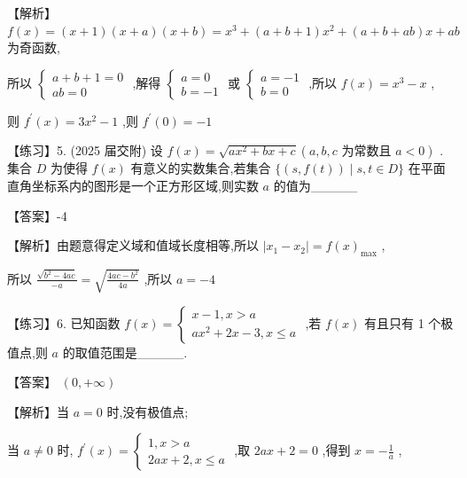 \documentclass[10pt]{article}
\begin{document}
【解析】 \(f\left( x\right)  = \left( {x + 1}\right) \left( {x + a}\right) \left( {x + b}\right)  = {x}^{3} + \left( {a + b + 1}\right) {x}^{2} + \left( {a + b + {ab}}\right) x + {ab}\) 为奇函数,

所以 \(\left\{  \begin{array}{l} a + b + 1 = 0 \\  {ab} = 0 \end{array}\right.\) ,解得 \(\left\{  \begin{array}{l} a = 0 \\  b =  - 1 \end{array}\right.\) 或 \(\left\{  \begin{array}{l} a =  - 1 \\  b = 0 \end{array}\right.\) ,所以 \(f\left( x\right)  = {x}^{3} - x\) ,

则 \({f}^{\prime }\left( x\right)  = 3{x}^{2} - 1\) ,则 \({f}^{\prime }\left( 0\right)  =  - 1\)

【练习】5. (2025 届交附) 设 \(f\left( x\right)  = \sqrt{a{x}^{2} + {bx} + c}\left( {a,b,c\text{ 为常数且 }a < 0}\right)\) . 集合 \(D\) 为使得 \(f\left( x\right)\) 有意义的实数集合,若集合 \(\{ \left( {s,f\left( t\right) }\right)  \mid  s,t \in  D\}\) 在平面直角坐标系内的图形是一个正方形区域,则实数 \(a\) 的值为\_\_\_\_\_

【答案】-4

【解析】由题意得定义域和值域长度相等,所以 \(\left| {{x}_{1} - {x}_{2}}\right|  = f{\left( x\right) }_{\max }\) ,

所以 \(\frac{\sqrt{{b}^{2} - {4ac}}}{-a} = \sqrt{\frac{{4ac} - {b}^{2}}{4a}}\) ,所以 \(a =  - 4\)

【练习】6. 已知函数 \(f\left( x\right)  = \left\{  \begin{array}{l} x - 1,x > a \\  a{x}^{2} + {2x} - 3,x \leq  a \end{array}\right.\) ,若 \(f\left( x\right)\) 有且只有 1 个极值点,则 \(a\) 的取值范围是\_\_\_\_\_.

【答案】 \(\left( {0, + \infty }\right)\)

【解析】当 \(a = 0\) 时,没有极值点;

当 \(a \neq  0\) 时, \({f}^{\prime }\left( x\right)  = \left\{  \begin{array}{l} 1,x > a \\  {2ax} + 2,x \leq  a \end{array}\right.\) ,取 \({2ax} + 2 = 0\) ,得到 \(x =  - \frac{1}{a}\) ,
\end{document}
